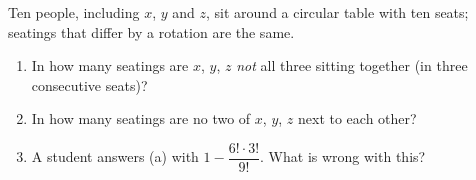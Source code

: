 Ten people, including $x$, $y$ and $z$, sit around a circular table with ten seats; seatings that differ by a rotation are the same.
\begin{enumerate}
\item[(a)] In how many seatings are $x$, $y$, $z$ \emph{not} all three sitting together (in three consecutive seats)?
\item[(b)] In how many seatings are no two of $x$, $y$, $z$ next to each other?
\item[(c)] A student answers (a) with $1-\dfrac{6!\cdot3!}{9!}$. What is wrong with this?
\end{enumerate}
